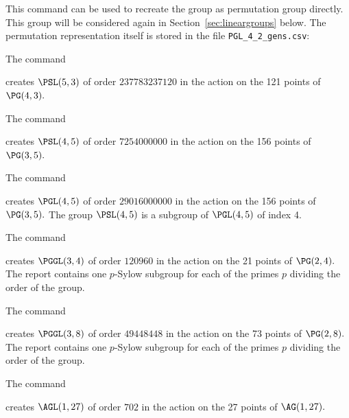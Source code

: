 
This command can be used to recreate the group as permutation group directly.
This group will be considered again in Section~\ref{sec:lineargroups} below.
The permutation representation itself is stored 
in the file \verb'PGL_4_2_gens.csv':

\bigskip



The command


creates $\PSL(5,3)$ of order $237783237120$ 
in the action on the 121 points of $\PG(4,3).$

\bigskip

The command


creates $\PSL(4,5)$ of order $7254000000$ 
in the action on the 156 points of $\PG(3,5).$

\bigskip


The command


creates $\PGL(4,5)$ of order $29016000000$ 
in the action on the 156 points of $\PG(3,5).$
The group $\PSL(4,5)$ is a subgroup of $\PGL(4,5)$ of index 4.

\bigskip



The command


creates $\PGGL(3,4)$ of order $120960$ 
in the action on the 21 points of $\PG(2,4).$
The report contains one $p$-Sylow subgroup 
for each of the primes $p$ dividing the order of the group.

\bigskip



The command


creates $\PGGL(3,8)$ of order $49448448$ 
in the action on the 73 points of $\PG(2,8).$
The report contains one $p$-Sylow subgroup for each 
of the primes $p$ dividing the order of the group.

\bigskip






The command


creates $\AGL(1,27)$ of order $702$ 
in the action on the 27 points of $\AG(1,27).$

